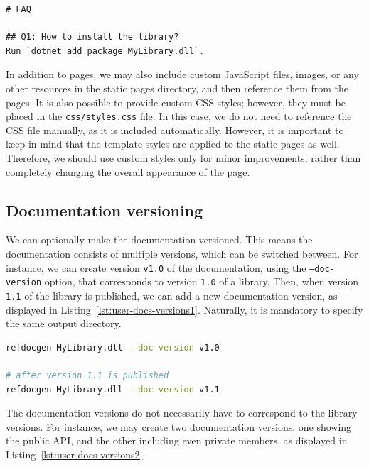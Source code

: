 \begin{listing}[H]
\begin{lstlisting}[language=HTML]
# FAQ

## Q1: How to install the library?
Run `dotnet add package MyLibrary.dll`.
\end{lstlisting}
\caption{Example static page in Markdown}
\label{lst:example-static-page2}
\end{listing}

In addition to pages, we may also include custom JavaScript files, images, or any other resources in the static pages directory, and then reference them from the pages.
It is also possible to provide custom CSS styles; however, they must be placed in the \texttt{css/styles.css} file.
In this case, we do not need to reference the CSS file manually, as it is included automatically.
However, it is important to keep in mind that the template styles are applied to the static pages as well.
Therefore, we should use custom styles only for minor improvements, rather than completely changing the overall appearance of the page.

\subsection{Documentation versioning}
\label{sec:user-docs-versions}

We can optionally make the documentation versioned.
This means the documentation consists of multiple versions, which can be switched between.
For instance, we can create version \texttt{v1.0} of the documentation, using the \texttt{--doc-version} option, that corresponds to version \texttt{1.0} of a library.
Then, when version \texttt{1.1} of the library is published, we can add a new documentation version, as
displayed in Listing~\ref{lst:user-docs-versions1}.
Naturally, it is mandatory to specify the same output directory.

\begin{listing}[H]
\begin{lstlisting}[language=bash]
refdocgen MyLibrary.dll --doc-version v1.0

# after version 1.1 is published
refdocgen MyLibrary.dll --doc-version v1.1
\end{lstlisting}
\caption{Creating various versions of the documentation}
\label{lst:user-docs-versions1}
\end{listing}

The documentation versions do not necessarily have to correspond to the library versions.
For instance, we may create two documentation versions, one showing the public API, and the other including even private members, as displayed in Listing~\ref{lst:user-docs-versions2}.

